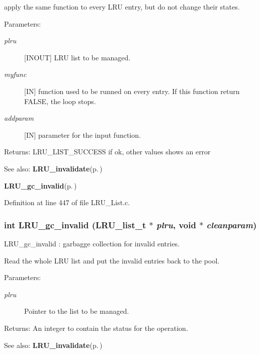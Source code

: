 apply the same function to every LRU entry, but do not change their states.

\begin{Desc}
\item[Parameters:]
\begin{description}
\item[{\em plru}][INOUT] LRU list to be managed. \item[{\em myfunc}][IN] function used to be runned on every entry. If this function return FALSE, the loop stops. \item[{\em addparam}][IN] parameter for the input function.\end{description}
\end{Desc}
\begin{Desc}
\item[Returns:]LRU\_\-LIST\_\-SUCCESS if ok, other values shows an error\end{Desc}
\begin{Desc}
\item[See also:]{\bf LRU\_\-invalidate}{\rm (p.\,\pageref{group__LRUExportedFunctions_ga1})} 

{\bf LRU\_\-gc\_\-invalid}{\rm (p.\,\pageref{group__LRUExportedFunctions_ga3})} \end{Desc}


Definition at line 447 of file LRU\_\-List.c.
\subsubsection{\setlength{\rightskip}{0pt plus 5cm}int LRU\_\-gc\_\-invalid (LRU\_\-list\_\-t $\ast$ {\em plru}, void $\ast$ {\em cleanparam})}\label{group__LRUExportedFunctions_ga3}


LRU\_\-gc\_\-invalid : garbagge collection for invalid entries.

Read the whole LRU list and put the invalid entries back to the pool.

\begin{Desc}
\item[Parameters:]
\begin{description}
\item[{\em plru}]Pointer to the list to be managed. \end{description}
\end{Desc}
\begin{Desc}
\item[Returns:]An integer to contain the status for the operation.\end{Desc}
\begin{Desc}
\item[See also:]{\bf LRU\_\-invalidate}{\rm (p.\,\pageref{group__LRUExportedFunctions_ga1})} \end{Desc}


